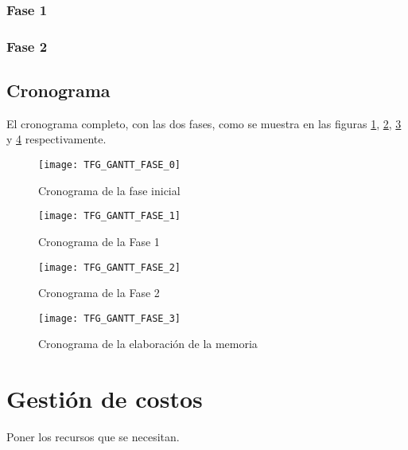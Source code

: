 \subsubsection{Fase 1}
\subsubsection{Fase 2}



\subsection{Cronograma}
El cronograma completo, con las dos fases, como se muestra en las figuras \ref{fig:gantt0}, \ref{fig:gantt1}, \ref{fig:gantt2} y \ref{fig:gantt3} respectivamente.

\begin{figure}[H]
	\centering
	\texttt{[image: TFG\_GANTT\_FASE\_0]}
	\caption{Cronograma de la fase inicial}
	\label{fig:gantt0}
\end{figure}

\begin{landscape}

\begin{figure}[H]
	\centering
	\texttt{[image: TFG\_GANTT\_FASE\_1]}
	\caption{Cronograma de la Fase 1}
	\label{fig:gantt1}
\end{figure}

\begin{figure}[H]
	\centering
	\texttt{[image: TFG\_GANTT\_FASE\_2]}
	\caption{Cronograma de la Fase 2}
	\label{fig:gantt2}
\end{figure}

\end{landscape}

\begin{figure}[H]
	\centering
	\texttt{[image: TFG\_GANTT\_FASE\_3]}
	\caption{Cronograma de la elaboración de la memoria}
	\label{fig:gantt3}
\end{figure}






\section{Gestión de costos}
{\color{red} Poner los recursos que se necesitan.}

